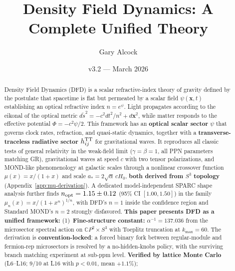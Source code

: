\documentclass[aps,prd,twocolumn,superscriptaddress,showpacs,floatfix,nofootinbib]{revtex4-2}
\newcommand{\DFD}{DFD\xspace}
\newcommand{\GR}{GR\xspace}
\theoremstyle{plain}
\theoremstyle{definition}
\theoremstyle{remark}
\begin{document}
\title{Density Field Dynamics: A Complete Unified Theory}

\author{Gary Alcock}

\date{v3.2 --- March 2026\\[2pt]
}

\begin{abstract}
Density Field Dynamics (\DFD) is a scalar refractive-index theory of gravity 
defined by the postulate that spacetime is flat but permeated by a scalar field 
$\psi(\mathbf{x},t)$ establishing an optical refractive index $n = e^\psi$. 
Light propagates according to the eikonal of the optical metric 
$d\tilde{s}^2 = -c^2 dt^2/n^2 + d\mathbf{x}^2$, while matter responds to the 
effective potential $\Phi = -c^2\psi/2$. This framework has an \textbf{optical scalar sector} 
$\psi$ that governs clock rates, refraction, and quasi-static dynamics, together with a 
\textbf{transverse-traceless radiative sector} $h^{\rm TT}_{ij}$ for gravitational waves. 
It reproduces all classic tests of general relativity in the weak-field limit 
($\gamma = \beta = 1$, all PPN parameters matching \GR), gravitational waves 
at speed $c$ with two tensor polarizations, and MOND-like phenomenology at 
galactic scales through a nonlinear crossover function $\mu(x) = x/(1+x)$ 
and scale $a_* = 2\sqrt{\alpha}\,cH_0$, \textbf{both derived from $S^3$ topology} (Appendix~\ref{app:mu-derivation}). A dedicated model-independent SPARC shape analysis further finds $n_{\rm opt}=1.15\pm0.12$ (95\% CI $[1.00,1.50]$) in the family $\mu_n(x)=x/(1+x^n)^{1/n}$, with DFD's $n=1$ inside the confidence region and Standard MOND's $n=2$ strongly disfavored.
%
\textbf{This paper presents DFD as a unified framework:}
%
(1)~\textbf{Fine-structure constant:} $\alpha^{-1} = 137.036$ from the microsector spectral action on $\mathbb{C}P^2 \times S^3$ 
with Toeplitz truncation at $k_{\max} = 60$. The derivation is \textbf{convention-locked}: a forced binary fork between regular-module 
and fermion-rep microsectors is resolved by a no-hidden-knobs policy, with the surviving branch matching experiment at sub-ppm level. 
\textbf{Verified by lattice Monte Carlo} (L6--L16; 9/10 at L16 with $p < 0.01$, mean $+1.1\%$);

\end{abstract}
\end{document}
